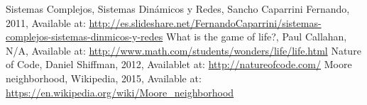 \begin{thebibliography}{1}
    Sistemas Complejos, Sistemas Dinámicos y Redes, Sancho Caparrini Fernando, 2011, Available at: \url{http://es.slideshare.net/FernandoCaparrini/sistemas-complejos-sistemas-dinmicos-y-redes}
    What is the game of life?, Paul Callahan, N/A, Available at: \url{http://www.math.com/students/wonders/life/life.html}
    Nature of Code, Daniel Shiffman, 2012, Availablet at: \url{http://natureofcode.com/}
    Moore neighborhood, Wikipedia, 2015, Available at: \url{https://en.wikipedia.org/wiki/Moore_neighborhood}
  
\end{thebibliography}

